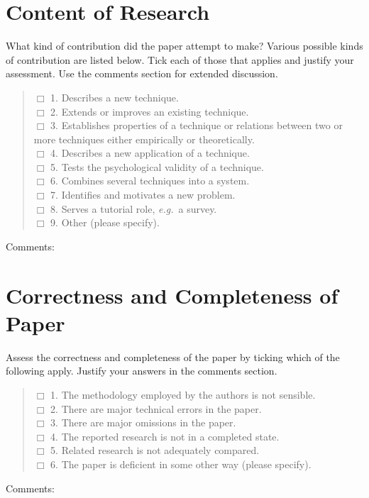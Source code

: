 \section{Content of Research}
{\small What kind of contribution did the paper attempt to make?
Various possible kinds of contribution are listed below.  Tick
each of those that applies and justify your assessment. Use the
comments section for extended discussion.}
\begin{verse}
$\Box$ 1. Describes a new technique.  \\
$\Box$ 2. Extends or improves an existing technique.  \\
$\Box$ 3. Establishes properties of a technique or relations between two
or more techniques either empirically or theoretically.  \\
$\Box$ 4. Describes a new application of a technique.  \\
$\Box$ 5. Tests the psychological validity of a technique.  \\
$\Box$ 6. Combines several techniques into a system.  \\
$\Box$ 7. Identifies and motivates a new problem.  \\
$\Box$ 8. Serves a tutorial role, {\em e.g.}~a survey.  \\
$\Box$ 9. Other (please specify).  \\
\end{verse}
Comments: \\
\framebox[6.8in][l]{\raisebox{0.15in}[0in][1in]{}}

\section{Correctness and Completeness of Paper}
{\small Assess the correctness and completeness of the paper by
ticking which of the following apply. Justify your answers in
the comments section.}
\begin{verse}
$\Box$ 1. The methodology employed by the authors is not sensible.  \\
$\Box$ 2. There are major technical errors in the paper.  \\
$\Box$ 3. There are major omissions in the paper.  \\
$\Box$ 4. The reported research is not in a completed state.  \\
$\Box$ 5. Related research is not adequately compared.  \\
$\Box$ 6. The paper is deficient in some other way (please specify).  \\
\end{verse}
Comments: \\
\framebox[6.8in][l]{\raisebox{0.15in}[0in][1in]{}}

